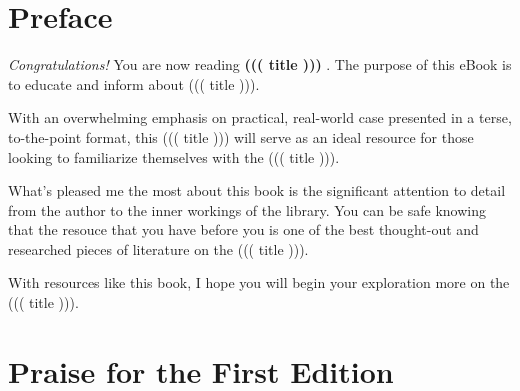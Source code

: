 \documentclass{article}
\begin{document}
\clearpage

\section*{Preface}
{\normalsize
\begin{flushleft}
\emph{Congratulations!} You are now reading \textbf{ ((( title ))) }. The
purpose of this eBook is to educate and inform about ((( title ))).
\end{flushleft}

\begin{flushleft}
With an overwhelming emphasis on practical, real-world case presented
in a terse, to-the-point format, this ((( title ))) will serve as an
ideal resource for those looking to familiarize themselves with the 
((( title ))).
\end{flushleft}

\begin{flushleft}
What's pleased me the most about this book is the significant
attention to detail from the author to the inner workings of the
library. You can be safe knowing that the resouce that you have before
you is one of the best thought-out and researched pieces of literature
on the ((( title ))).
\end{flushleft}

\begin{flushleft}
With resources like this book, I hope you will begin your exploration
more on the ((( title ))).
\end{flushleft}
}

\clearpage

\section*{Praise for the First Edition}
\end{document}
